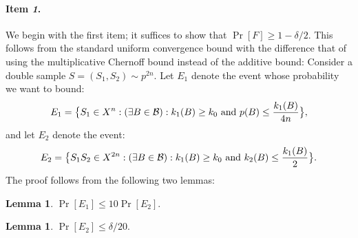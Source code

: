 \documentclass{article}
\newtheorem{lemma}[theorem]{Lemma}
\newcommand{\B}{{\cal B}}
\newcommand{\samp}{S}
\begin{document}
\paragraph{Item {\it 1}.}
We begin with the first item;
it suffices to show that $\Pr[F]\geq 1-\delta/2$.
This follows from the standard uniform convergence bound with
the difference that of using the multiplicative Chernoff bound instead
of the additive bound:
Consider a double sample $S=(\samp_1,\samp_2)\sim p^{2n}$.
Let $E_1$ denote the event whose probability we want to bound:
\[
E_1 =\bigl\{ S_1\in X^n : (\exists {B\in\B}):
  k_{1}(B) \geq k_0 \mbox{ and } p(B) \leq \frac{k_{1}(B)}{4n}\bigr\}, 
\]
and let $E_2$ denote the event:
\[
E_2 = 
\bigl\{ S_1S_2\in X^{2n} : (\exists {B\in\B}):
  k_{1}(B) \geq k_0 \mbox{ and } k_{2}(B) \leq \frac{k_{1}(B)}{2}\bigr\}.
\]
The proof follows from the following two lemmas:
\begin{lemma}\label{lem:aux11}
$\Pr[E_1]\leq 10\Pr[E_2].$
\end{lemma}
\begin{lemma}\label{lem:aux12}
$\Pr[E_2]\leq \delta/20.$
\end{lemma}
\end{document}
